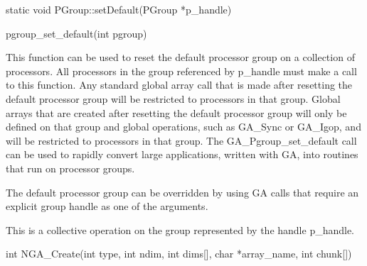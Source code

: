 \documentclass[12pt]{article}
\begin{document}
\begin{cxxapi}
\begin{cxxcode}
static void PGroup::setDefault(PGroup *p_handle)
\end{cxxcode}
\begin{funcargs}
\end{funcargs}
\end{cxxapi}

\begin{pyapi}
\begin{pycode}
pgroup_set_default(int pgroup)
\end{pycode}
\begin{funcargs}
\end{funcargs}
\end{pyapi}

\gcoll

\begin{desc}

This function can be used to reset the default processor group on a collection
of processors. All processors in the group referenced by p_handle must make a
call to this function. Any standard global array call that is made after
resetting the default processor group will be restricted to processors in that
group. Global arrays that are created after resetting the default processor
group will only be defined on that group and global operations, such as GA_Sync
or GA_Igop, and will be restricted to processors in that group. The
GA_Pgroup_set_default call can be used to rapidly convert large applications,
written with GA, into routines that run on processor groups.

The default processor group can be overridden by using GA calls that require an
explicit group handle as one of the arguments.

This is a collective operation on the group represented by the handle p_handle.

\end{desc}


\begin{capi}
\begin{ccode}
int NGA_Create(int type, int ndim, int dims[], char *array_name, int chunk[])
\end{ccode}
\begin{funcargs}
\end{funcargs}
\end{capi}
\end{document}
